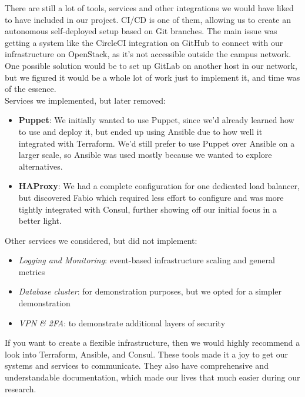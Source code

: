         There are still a lot of tools, services and other integrations we would have liked to have included in our project. CI/CD is one of them, allowing us to create an autonomous self-deployed setup based on Git branches. The main issue was getting a system like the CircleCI integration on GitHub to connect with our infrastructure on OpenStack, as it's not accessible outside the campus network. One possible solution would be to set up GitLab on another host in our network, but we figured it would be a whole lot of work just to implement it, and time was of the essence.\\
        
        Services we implemented, but later removed:
        \begin{itemize}
            \item \textbf{Puppet}: We initially wanted to use Puppet, since we'd already learned how to use and deploy it, but ended up using Ansible due to how well it integrated with Terraform. We'd still prefer to use Puppet over Ansible on a larger scale, so Ansible was used mostly because we wanted to explore alternatives.
            \item \textbf{HAProxy}: We had a complete configuration for one dedicated load balancer, but discovered Fabio which required less effort to configure and was more tightly integrated with Consul, further showing off our initial focus in a better light.
        \end{itemize}
        
        Other services we considered, but did not implement:
        \begin{itemize}
            \item \textit{Logging and Monitoring}: event-based infrastructure scaling and general metrics
            \item \textit{Database cluster}: for demonstration purposes, but we opted for a simpler demonstration
            \item \textit{VPN \& 2FA}: to demonstrate additional layers of security
        \end{itemize}
        
        If you want to create a flexible infrastructure, then we would highly recommend a look into Terraform, Ansible, and Consul. These tools made it a joy to get our systems and services to communicate. They also have comprehensive and understandable documentation, which made our lives that much easier during our research.
        

